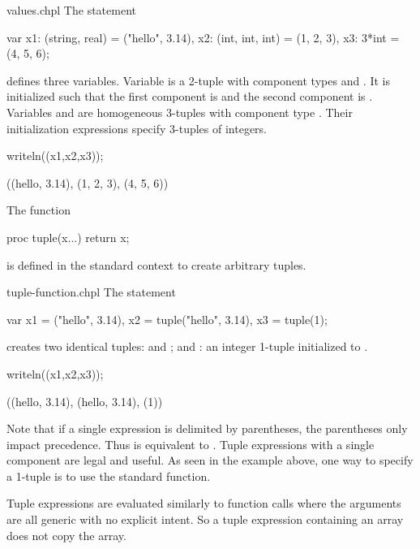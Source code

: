 \begin{chapelexample}{values.chpl}
The statement
\begin{chapel}
var x1: (string, real) = ("hello", 3.14),
    x2: (int, int, int) = (1, 2, 3),
    x3: 3*int = (4, 5, 6);
\end{chapel}
defines three variables.  Variable  is a 2-tuple with
component types  and .  It is initialized such
that the first component is  and the second
component is .  Variables  and  are
homogeneous 3-tuples with component type .  Their
initialization expressions specify 3-tuples of integers.
\begin{chapelpost}
writeln((x1,x2,x3));
\end{chapelpost}
\begin{chapeloutput}
((hello, 3.14), (1, 2, 3), (4, 5, 6))
\end{chapeloutput}
\end{chapelexample}

The function
\begin{chapel}
proc tuple(x...) return x;
\end{chapel}
is defined in the standard context to create arbitrary tuples.

\begin{chapelexample}{tuple-function.chpl}
The statement
\begin{chapel}
var x1 =      ("hello", 3.14),
    x2 = tuple("hello", 3.14),
    x3 = tuple(1);
\end{chapel}
creates two identical tuples:  and ; and : an integer 1-tuple
 initialized to .
\begin{chapelpost}
writeln((x1,x2,x3));
\end{chapelpost}
\begin{chapeloutput}
((hello, 3.14), (hello, 3.14), (1))
\end{chapeloutput}
\end{chapelexample}

Note that if a single expression is delimited by parentheses, the
parentheses only impact precedence.  Thus  is equivalent
to .  Tuple expressions with a single component are legal and
useful.  As seen in the example above, one way to specify a 1-tuple is
to use the standard  function.

Tuple expressions are evaluated similarly to function calls where the
arguments are all generic with no explicit intent.  So a tuple
expression containing an array does not copy the array.  

